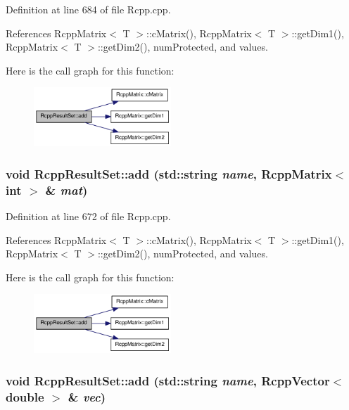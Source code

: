 Definition at line 684 of file Rcpp.cpp.

References RcppMatrix$<$ T $>$::cMatrix(), RcppMatrix$<$ T $>$::getDim1(), RcppMatrix$<$ T $>$::getDim2(), numProtected, and values.

Here is the call graph for this function:\nopagebreak
\begin{figure}[H]
\begin{center}
\leavevmode
\includegraphics[width=146pt]{classRcppResultSet_af6f50ca0a589fc12ef68c0406e83243b_cgraph}
\end{center}
\end{figure}
\hypertarget{classRcppResultSet_a56f1bff720a6cf6503ab942bdb6892b3}{
\subsubsection[{add}]{\setlength{\rightskip}{0pt plus 5cm}void RcppResultSet::add (std::string {\em name}, \/  {\bf RcppMatrix}$<$ int $>$ \& {\em mat})}}
\label{classRcppResultSet_a56f1bff720a6cf6503ab942bdb6892b3}


Definition at line 672 of file Rcpp.cpp.

References RcppMatrix$<$ T $>$::cMatrix(), RcppMatrix$<$ T $>$::getDim1(), RcppMatrix$<$ T $>$::getDim2(), numProtected, and values.

Here is the call graph for this function:\nopagebreak
\begin{figure}[H]
\begin{center}
\leavevmode
\includegraphics[width=146pt]{classRcppResultSet_a56f1bff720a6cf6503ab942bdb6892b3_cgraph}
\end{center}
\end{figure}
\hypertarget{classRcppResultSet_a10a64eb042cd3bac5b635670ae2fff5d}{
\subsubsection[{add}]{\setlength{\rightskip}{0pt plus 5cm}void RcppResultSet::add (std::string {\em name}, \/  {\bf RcppVector}$<$ double $>$ \& {\em vec})}}
\label{classRcppResultSet_a10a64eb042cd3bac5b635670ae2fff5d}



